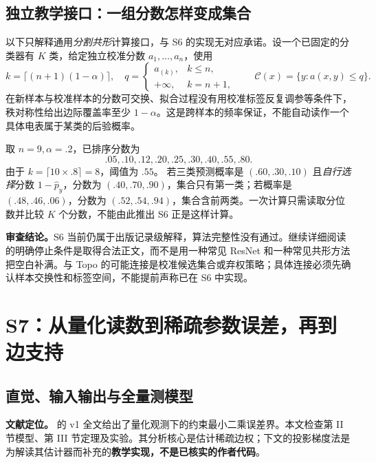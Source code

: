 \subsection{独立教学接口：一组分数怎样变成集合}

以下只解释通用\emph{分割共形}计算接口，与 S6 的实现无对应承诺。设一个已固定的分类器有 $K$ 类，给定独立校准分数 $a_1,\ldots,a_n$，使用
\begin{equation}
 k=\lceil(n+1)(1-\alpha)\rceil,\quad
 q=\begin{cases}a_{(k)},&k\le n,\\+\infty,&k=n+1,\end{cases}
 \qquad \mathcal C(x)=\{y:a(x,y)\le q\}.
 \label{eq:dq_generic_cp}
\end{equation}
在新样本与校准样本的分数可交换、拟合过程没有用校准标签反复调参等条件下，秩对称性给出边际覆盖率至少 $1-\alpha$。这是跨样本的频率保证，不能自动读作一个具体电表属于某类的后验概率。

\begin{example}[非 S6 实验的九个校准分数]
取 $n=9,\alpha=.2$，已排序分数为
\[.05,.10,.12,.20,.25,.30,.40,.55,.80.\]
由于 $k=\lceil10\times.8\rceil=8$，阈值为 $.55$。
若三类预测概率是 $(.60,.30,.10)$ 且\emph{自行选择}分数 $1-\hat p_y$，分数为 $(.40,.70,.90)$，集合只有第一类；若概率是 $(.48,.46,.06)$，分数为 $(.52,.54,.94)$，集合含前两类。一次计算只需读取分位数并比较 $K$ 个分数，不能由此推出 S6 正是这样计算。
\end{example}

\textbf{审查结论。}S6 当前仍属于出版记录级解释，算法完整性没有通过。继续详细阅读的明确停止条件是取得合法正文，而不是用一种常见 ResNet 和一种常见共形方法把空白补满。与 Topo 的可能连接是校准候选集合或弃权策略；具体连接必须先确认样本交换性和标签空间，不能提前声称已在 S6 中实现。

\section{S7：从量化读数到稀疏参数误差，再到边支持}
\label{sec:dq_s7}

\subsection{直觉、输入输出与全量测模型}

\textbf{文献定位。}\citet{S7} 的 v1 全文给出了量化观测下的约束最小二乘误差界。本文检查第 II 节模型、第 III 节定理及实验。其分析核心是估计稀疏边权；下文的投影梯度法是为解读其估计器而补充的\textbf{教学实现，不是已核实的作者代码}。

